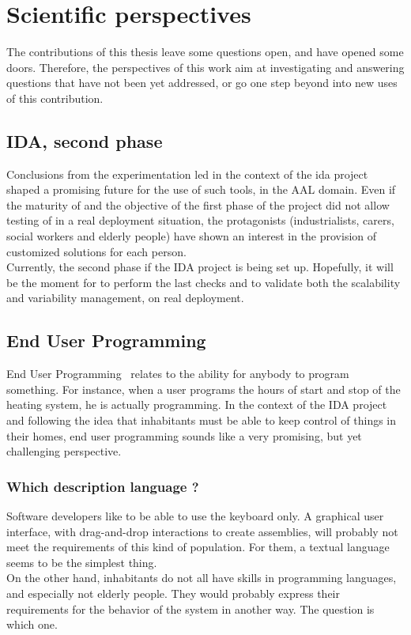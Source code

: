 \chapter{Scientific perspectives}

The contributions of this thesis leave some questions open, and have opened some doors. Therefore, the perspectives of this work aim at investigating and answering questions that have not been yet addressed, or go one step beyond into new uses of this contribution.


\section{IDA, second phase}
Conclusions from the experimentation led in the context of the \gls{ida} project shaped a promising future for the use of such tools, in the AAL domain. Even if the maturity of \enti{} and the objective of the first phase of the project did not allow testing of \enti{} in a real deployment situation, the protagonists (industrialists, carers, social workers and elderly people) have shown an interest in the provision of customized solutions for each person.\\
Currently, the second phase if the IDA project is being set up. Hopefully, it will be the moment for \enti{} to perform the last checks and to validate both the scalability and variability management, on real deployment.


\section{End User Programming}

End User Programming~\cite{Ko:2011} relates to the ability for anybody to program something. For instance, when a user programs the hours of start and stop of the heating system, he is actually programming. In the context of the IDA project and following the idea that inhabitants must be able to keep control of things in their homes, end user programming sounds like a very promising, but yet challenging perspective.\\

\subsection{Which description language ?}
Software developers like to be able to use the keyboard only. A graphical user interface, with drag-and-drop interactions to create assemblies, will probably not meet the requirements of this kind of population. For them, a textual language seems to be the simplest thing.\\
On the other hand, inhabitants do not all have skills in programming languages, and especially not elderly people. They would probably express their requirements for the behavior of the system in another way. The question is which one.\\

